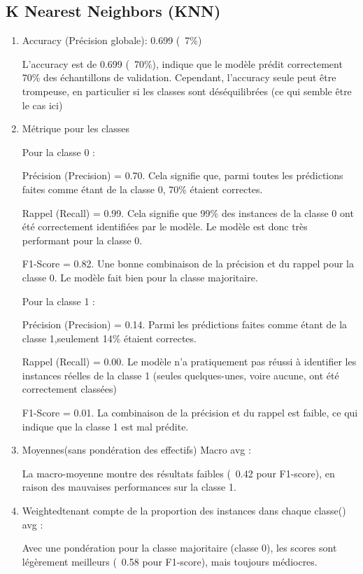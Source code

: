 \subsection{K Nearest Neighbors (KNN)}
\begin{flushleft}
\begin{enumerate}

\item Accuracy (Précision globale): 0.699 (~7\%)

L'accuracy est de 0.699 (~70\%), indique que le modèle prédit correctement 70\% des échantillons de validation. Cependant, l'accuracy seule peut être trompeuse, en particulier si les classes sont déséquilibrées (ce qui semble être le cas ici)

\item Métrique pour les classes

Pour la classe 0 :

Précision (Precision) = 0.70. Cela signifie que, parmi toutes les prédictions faites comme étant de la classe 0, 70\% étaient correctes.

Rappel (Recall) = 0.99. Cela signifie que 99\% des instances de la classe 0 ont été correctement identifiées par le modèle. Le modèle est donc très performant pour la classe 0.

F1-Score = 0.82. Une bonne combinaison de la précision et du rappel pour la classe 0. Le modèle fait bien pour la classe majoritaire.

Pour la classe 1 :

Précision (Precision) = 0.14. Parmi les prédictions faites comme étant de la classe 1,seulement 14\% étaient correctes.

Rappel (Recall) = 0.00. Le modèle n'a pratiquement pas réussi à identifier les instances réelles de la classe 1 (seules quelques-unes, voire aucune, ont été correctement classées)

F1-Score = 0.01. La combinaison de la précision et du rappel est faible, ce qui indique que la classe 1 est mal prédite.

\item Moyennes(sans pondération des effectifs) Macro avg :

La macro-moyenne montre des résultats faibles (~0.42 pour F1-score), en raison des mauvaises performances sur la classe 1.

\item Weightedtenant compte de la proportion des instances dans chaque classe() avg :

Avec une pondération pour la classe majoritaire (classe 0), les scores sont légèrement meilleurs (~0.58 pour F1-score), mais toujours médiocres.


\end{enumerate}
\end{flushleft}
